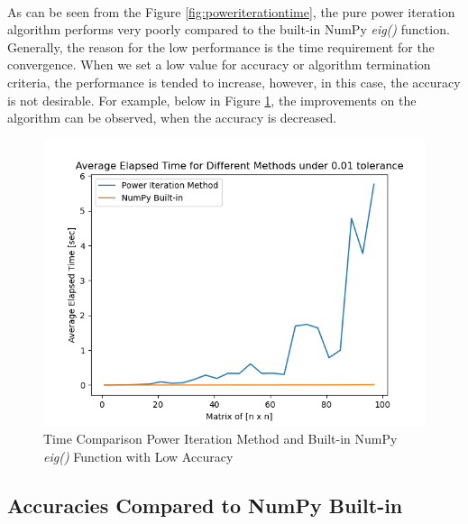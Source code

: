 \documentclass[letterpaper,12pt]{article}
\begin{document}
\paragraph{} As can be seen from the Figure \ref{fig:poweriterationtime}, the pure power iteration algorithm performs very poorly compared to the built-in NumPy \textit{eig()} function. Generally, the reason for the low performance is the time requirement for the convergence. When we set a low value for accuracy or algorithm termination criteria, the performance is tended to increase, however, in this case, the accuracy is not desirable. For example, below in Figure \ref{fig:poweriterationtimelowtol}, the improvements on the algorithm can be observed, when the accuracy is decreased. 

\begin{figure}[H] 
   \centering \includegraphics[width=\columnwidth]{figures/poweriterationtimelowtol.png}           
                  \caption{Time Comparison Power Iteration Method and Built-in NumPy \textit{eig()} Function with Low Accuracy}                
                     \label{fig:poweriterationtimelowtol}
   \end{figure}

   \subsection{Accuracies Compared to NumPy Built-in}
\end{document}
